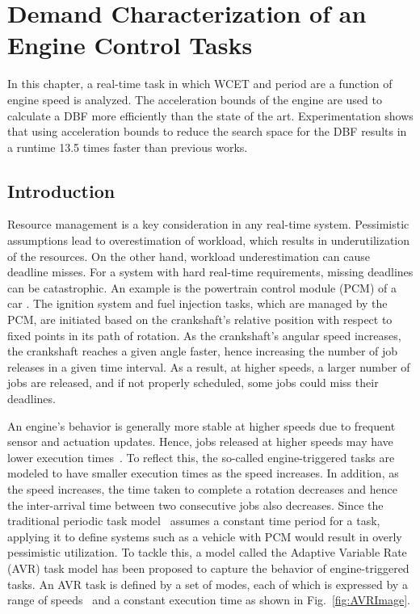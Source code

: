 \section{Demand Characterization of an Engine Control Tasks}   \label{chap:engCtrl}

In this chapter, a real-time task  in which WCET and period are a function of engine speed is analyzed.
The acceleration bounds of the engine are used to calculate a DBF more efficiently than the state of the art.
Experimentation shows that using acceleration bounds to reduce the search space for the DBF results in a runtime 13.5 times faster than previous works.

\subsection{Introduction}

Resource management is a key consideration in any real-time system.
Pessimistic assumptions lead to overestimation of workload, which results in underutilization of the resources. On the other hand, workload underestimation can cause deadline misses.
For a system with hard real-time requirements, missing deadlines can be catastrophic.
An example is the powertrain control module (PCM) of a car \cite{noauthor_electricalelectronic_2008}. 
The ignition system and fuel injection tasks, which are managed by the PCM, are initiated based on the crankshaft's relative position with respect to fixed points in its path of rotation. 
As the crankshaft's angular speed increases, the crankshaft reaches a given angle faster, hence increasing the number of job releases in a given time interval.
As a result, at higher speeds, a larger number of jobs are released, and if not properly scheduled, some jobs could miss their deadlines.

An engine's behavior is generally more stable at higher speeds due to frequent sensor and actuation updates. Hence, jobs released at higher speeds may have lower execution times~\cite{dbuttle_real-time_nodate}.
To reflect this, the so-called engine-triggered tasks are modeled to have smaller execution times as the speed increases.
In addition, as the speed increases, the time taken to complete a rotation decreases and hence the inter-arrival time between two consecutive jobs also decreases.
Since the traditional periodic task model~\cite{liu_scheduling_1973} assumes a constant time period for a task, applying it to define systems such as a vehicle with PCM would result in overly pessimistic utilization.
To tackle this, a model called the Adaptive Variable Rate (AVR) task model has been proposed to capture the behavior of engine-triggered tasks.
An AVR task is defined by a set of modes, each of which is expressed by a range of speeds~\cite{dbuttle_real-time_nodate} and a constant execution time as shown in Fig.~\ref{fig:AVRImage}.

